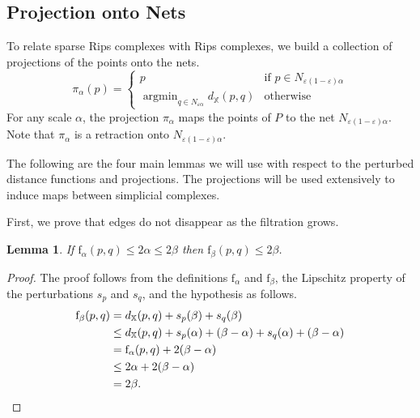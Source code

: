 \documentclass[a4paper]{article}
\newcommand\X{\mathbb{X}}
\newcommand\dX[2]{d_\X(#1,#2)}
\newtheorem{lemma}[theorem]{Lemma}
\newcommand{\e}{\varepsilon}
\newcommand{\net}{N}
\newcommand{\ff}{\mathrm{f}}
\newcommand{\proj}{\pi}
\DeclareMathOperator\argmin{argmin}
\begin{document}
\subsection{Projection onto Nets} \label{sub:projection_onto_nets}
To relate sparse Rips complexes with Rips complexes, we build a collection of projections of the points onto the nets.
  \[
    \proj_\alpha(p) = 
      \begin{cases}
        p & \text{if } p\in \net_{\e(1-\e)\alpha}\\
        \argmin_{q\in \net_{\e\alpha}} \dX{p}{q} & \text{otherwise}
      \end{cases}
  \]
  For any scale $\alpha$, the projection $\proj_\alpha$ maps the points of $P$ to the net $\net_{\e(1-\e)\alpha}$.
  Note that $\proj_\alpha$ is a retraction onto $\net_{\e(1-\e)\alpha}$.
  
  The following are the four main lemmas we will use with respect to the perturbed distance functions and projections.
  The projections will be used extensively to induce maps between simplicial complexes.
  
First, we prove that edges do not disappear as the filtration grows.  
  \begin{lemma}\label{lem:filtration}
    If $\ff_\alpha(p,q) \le 2 \alpha \le 2 \beta$ then $\ff_\beta(p,q)\le 2 \beta$.
  \end{lemma}
  \begin{proof}
    The proof follows from the definitions $\ff_\alpha$ and $\ff_\beta$, the Lipschitz property of the perturbations $s_p$ and $s_q$, and the hypothesis as follows.
    \begin{align*}
      \ff_\beta(p,q) 
        &=   \dX{p}{q} + s_p(\beta) + s_q(\beta)\\ &\le \dX{p}{q} + s_p(\alpha) + (\beta-\alpha) + s_q(\alpha) + (\beta-\alpha)\\ &=   \ff_\alpha(p,q) + 2(\beta-\alpha)\\ &\le 2 \alpha + 2(\beta-\alpha)\\ &=   2 \beta.\qedhere
    \end{align*}
  \end{proof}
 
\end{document}
